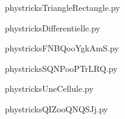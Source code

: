 
    \newcommand{\CaptionFigTriangleRectangle}{<+Type your caption here+>}
    \begin{center}
        
    \end{center}
    phystricksTriangleRectangle.py

    

    \clearpage
    


    \newcommand{\CaptionFigDifferentielle}{<+Type your caption here+>}
    \begin{center}
        
    \end{center}
    phystricksDifferentielle.py

    

    \clearpage
    


    \newcommand{\CaptionFigFNBQooYgkAmS}{<+Type your caption here+>}
    \begin{center}
        
    \end{center}
    phystricksFNBQooYgkAmS.py

    

    \clearpage
    


    \newcommand{\CaptionFigSQNPooPTrLRQ}{<+Type your caption here+>}
    \begin{center}
        
    \end{center}
    phystricksSQNPooPTrLRQ.py

    

    \clearpage
    


    \newcommand{\CaptionFigUneCellule}{<+Type your caption here+>}
    \begin{center}
        
    \end{center}
    phystricksUneCellule.py

    

    \clearpage
    


    \newcommand{\CaptionFigQIZooQNQSJj}{<+Type your caption here+>}
    \begin{center}
        
    \end{center}
    phystricksQIZooQNQSJj.py

